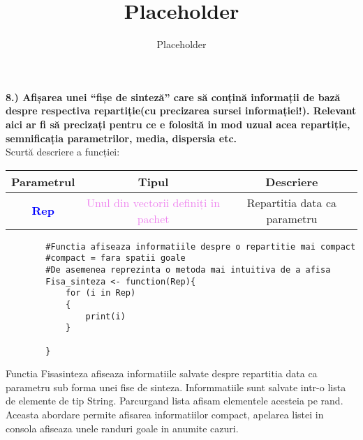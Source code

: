\documentclass[12pt]{article}
\title{Placeholder}
\author{Placeholder}
\begin{document}
	
	\textbf{8.) Afișarea unei “fișe de sinteză” care să conțină informații de bază despre respectiva
		repartiție(cu precizarea sursei informației!). Relevant aici ar fi să precizați pentru ce e
		folosită in mod uzual acea repartiție, semnificația parametrilor, media, dispersia etc.}\vspace{5mm}\\
\indent Scurtă descriere a funcției: \\
\begin{center}
	\begin{tabular}{|| c | c | c ||}
		\hline
		Parametrul & Tipul & Descriere \\
		\hline
		\textbf{\textcolor{blue}{Rep}} & \textcolor{violet}{Unul din vectorii definiți in pachet} & Repartitia data ca parametru \\
		\hline
	\end{tabular}
\end{center}	
	\begin{lstlisting}
		#Functia afiseaza informatiile despre o repartitie mai compact
		#compact = fara spatii goale
		#De asemenea reprezinta o metoda mai intuitiva de a afisa
		Fisa_sinteza <- function(Rep){
			for (i in Rep)
			{
				print(i)
			}
			
		}
	\end{lstlisting}
	
	
	Functia Fisa\underline{\hspace{.08in}}sinteza afiseaza informatiile salvate despre repartitia data ca parametru sub forma unei fise de sinteza.\hfill \break
	\indent Informmatiile sunt salvate intr-o lista de elemente de tip String. Parcurgand lista afisam elementele acesteia pe rand. Aceasta abordare permite afisarea informatiilor compact, apelarea listei in consola afiseaza unele randuri goale in anumite cazuri.
	
	
\end{document}
